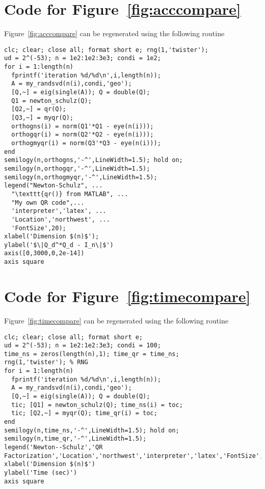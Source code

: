 \section{Code for Figure~\ref{fig:acccompare}}\label{app:fig:acccompare}
Figure~\ref{fig:acccompare} can be regenerated using the following routine 
\begin{lstlisting}
clc; clear; close all; format short e; rng(1,'twister');
ud = 2^(-53); n = 1e2:1e2:3e3; condi = 1e2;
for i = 1:length(n)
  fprintf('iteration %d/%d\n',i,length(n));
  A = my_randsvd(n(i),condi,'geo');  
  [Q,~] = eig(single(A)); Q = double(Q);
  Q1 = newton_schulz(Q); 
  [Q2,~] = qr(Q);
  [Q3,~] = myqr(Q);
  orthogns(i) = norm(Q1'*Q1 - eye(n(i)));
  orthogqr(i) = norm(Q2'*Q2 - eye(n(i)));
  orthogmyqr(i) = norm(Q3'*Q3 - eye(n(i)));
end
semilogy(n,orthogns,'-^',LineWidth=1.5); hold on; 
semilogy(n,orthogqr,'-^',LineWidth=1.5); 
semilogy(n,orthogmyqr,'-^',LineWidth=1.5); 
legend("Newton-Schulz", ...
  "\texttt{qr()} from MATLAB", ...
  "My own QR code",...
  'interpreter','latex', ...
  'Location','northwest', ...
  'FontSize',20); 
xlabel('Dimension $(n)$');
ylabel('$\|Q_d^*Q_d - I_n\|$')
axis([0,3000,0,2e-14])
axis square
\end{lstlisting}


\section{Code for Figure~\ref{fig:timecompare}}
\label{app:fig:timecompare}
Figure~\ref{fig:timecompare} can be regenerated using the following routine 
\begin{lstlisting}
clc; clear; close all; format short e; 
ud = 2^(-53); n = 1e2:1e2:3e3; condi = 100;
time_ns = zeros(length(n),1); time_qr = time_ns;
rng(1,'twister'); % RNG
for i = 1:length(n)
  fprintf('iteration %d/%d\n',i,length(n));
  A = my_randsvd(n(i),condi,'geo');
  [Q,~] = eig(single(A)); Q = double(Q);
  tic; [Q1] = newton_schulz(Q); time_ns(i) = toc;
  tic; [Q2,~] = myqr(Q); time_qr(i) = toc;
end
semilogy(n,time_ns,'-^',LineWidth=1.5); hold on; 
semilogy(n,time_qr,'-^',LineWidth=1.5); 
legend('Newton--Schulz','QR Factorization','Location','northwest','interpreter','latex','FontSize',20); 
xlabel('Dimension $(n)$')
ylabel('Time (sec)')
axis square  
\end{lstlisting}


